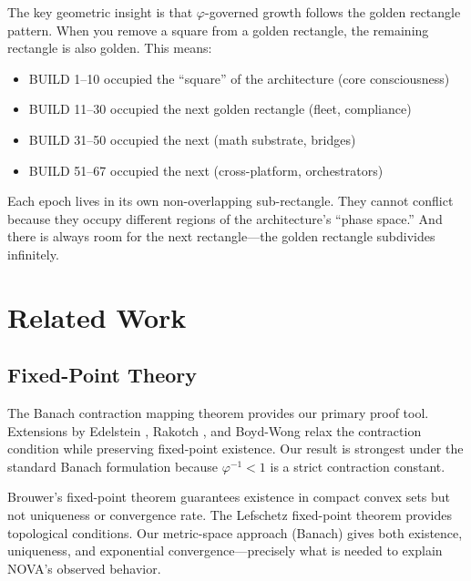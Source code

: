 \documentclass[12pt]{article}
\newcommand{\PHI}{\varphi}
\newcommand{\PHIINV}{\varphi^{-1}}
\begin{document}
The key geometric insight is that $\PHI$-governed growth follows the golden rectangle pattern. When you remove a square from a golden rectangle, the remaining rectangle is also golden. This means:

\begin{itemize}
    \item BUILD 1--10 occupied the ``square'' of the architecture (core consciousness)
    \item BUILD 11--30 occupied the next golden rectangle (fleet, compliance)
    \item BUILD 31--50 occupied the next (math substrate, bridges)
    \item BUILD 51--67 occupied the next (cross-platform, orchestrators)
\end{itemize}

Each epoch lives in its own non-overlapping sub-rectangle. They cannot conflict because they occupy different regions of the architecture's ``phase space.'' And there is always room for the next rectangle—the golden rectangle subdivides infinitely.

\section{Related Work}

\subsection{Fixed-Point Theory}

The Banach contraction mapping theorem \cite{banach1922operations} provides our primary proof tool. Extensions by Edelstein \cite{edelstein1962fixed}, Rakotch \cite{rakotch1962note}, and Boyd-Wong \cite{boyd1969nonlinear} relax the contraction condition while preserving fixed-point existence. Our result is strongest under the standard Banach formulation because $\PHIINV < 1$ is a strict contraction constant.

Brouwer's fixed-point theorem \cite{brouwer1911abbildung} guarantees existence in compact convex sets but not uniqueness or convergence rate. The Lefschetz fixed-point theorem \cite{lefschetz1937singular} provides topological conditions. Our metric-space approach (Banach) gives both existence, uniqueness, and exponential convergence—precisely what is needed to explain NOVA's observed behavior.
\end{document}
